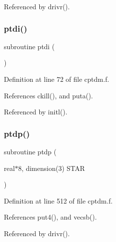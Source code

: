 Referenced by drivr().

\mbox{\label{cptdm_8f_a87538f3fc5fa26902164adbb4d73b400}} 
\subsubsection{\texorpdfstring{ptdi()}{ptdi()}}
{\footnotesize\ttfamily subroutine ptdi (\begin{DoxyParamCaption}{ }\end{DoxyParamCaption})}



Definition at line 72 of file cptdm.\+f.



References ckill(), and puta().



Referenced by initl().

\mbox{\label{cptdm_8f_a76fce9f19de9d44ffba70d730a87f394}} 
\subsubsection{\texorpdfstring{ptdp()}{ptdp()}}
{\footnotesize\ttfamily subroutine ptdp (\begin{DoxyParamCaption}\item[{real$\ast$8, dimension(3)}]{S\+T\+AR }\end{DoxyParamCaption})}



Definition at line 512 of file cptdm.\+f.



References put4(), and vecsb().



Referenced by drivr().

